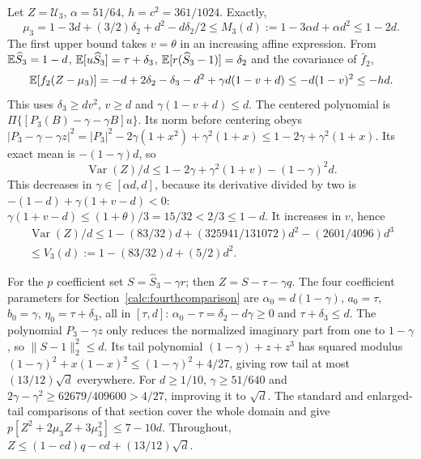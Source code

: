 Let $Z=\mathcal U_3$, $\alpha=51/64$, $h=c^2=361/1024$.
Exactly,
\[
\mu_3=1-3d+(3/2)\delta_2+d^2-d\delta_2/2
\le M_3(d):=1-3\alpha d+\alpha d^2\le1-2d.
\]
The first upper bound takes $v=\theta$ in an increasing affine expression.
From $\mathbb E\widehat S_3=1-d$, $\mathbb E[u\widehat S_3]=\tau+\delta_3$,
$\mathbb E[r(\widehat S_3-1)]=\delta_2$ and the covariance of $\bar f_2$,
\[
\mathbb E[f_2(Z-\mu_3)]=-d+2\delta_2-\delta_3-d^2
+\gamma d(1-v+d)\le-d(1-v)^2\le-hd.
\]
This uses $\delta_3\ge dv^2$, $v\ge d$ and $\gamma(1-v+d)\le d$.
The centered polynomial is $\Pi\{[P_3(B)-\gamma-\gamma B]u\}$.
Its norm before centering obeys
$|P_3-\gamma-\gamma z|^2=|P_3|^2-2\gamma(1+x^2)+\gamma^2(1+x)
\le1-2\gamma+\gamma^2(1+x)$.
Its exact mean is $-(1-\gamma)d$, so
\[
\operatorname{Var}(Z)/d\le1-2\gamma+\gamma^2(1+v)-(1-\gamma)^2d.
\]
This decreases in $\gamma\in[\alpha d,d]$, because its derivative
divided by two is $-(1-d)+\gamma(1+v-d)<0$:
$\gamma(1+v-d)\le(1+\theta)/3=15/32<2/3\le1-d$.
It increases in $v$, hence
\[
\begin{gathered}
\operatorname{Var}(Z)/d\le1-(83/32)d+(325941/131072)d^2-(2601/4096)d^3
\\\le V_3(d):=1-(83/32)d+(5/2)d^2.
\end{gathered}
\]

For the $p$ coefficient set $S=\widehat S_3-\gamma r$;
then $Z=S-\tau-\gamma q$. The four coefficient parameters for
Section~\ref{calc:fourthcomparison} are
$\alpha_0=d(1-\gamma)$, $a_0=\tau$, $b_0=\gamma$,
$\eta_0=\tau+\delta_3$, all in $[\tau,d]$:
$\alpha_0-\tau=\delta_2-d\gamma\ge0$ and $\tau+\delta_3\le d$.
The polynomial $P_3-\gamma z$ only reduces the normalized imaginary
part from one to $1-\gamma$, so $\|S-1\|_2^2\le d$.
Its tail polynomial $(1-\gamma)+z+z^3$ has squared modulus
$(1-\gamma)^2+x(1-x)^2\le(1-\gamma)^2+4/27$,
giving row tail at most $(13/12)\sqrt d$ everywhere.
For $d\ge1/10$, $\gamma\ge51/640$ and
$2\gamma-\gamma^2\ge62679/409600>4/27$, improving it to $\sqrt d$.
The standard and enlarged-tail comparisons of that section cover the
whole domain and give
$p[Z^2+2\mu_3Z+3\mu_3^2]\le7-10d$.
Throughout, $Z\le(1-cd)q-cd+(13/12)\sqrt d$.

